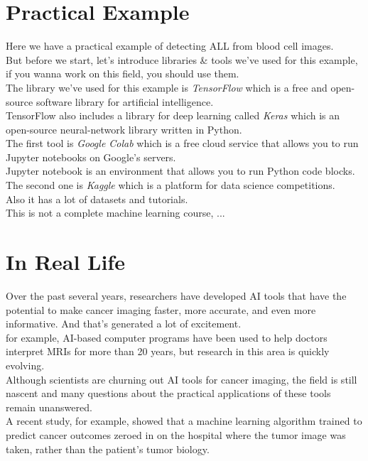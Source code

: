 \documentclass{SBCbookchapter}
\begin{document}
\section*{Practical Example}
Here we have a practical example of detecting ALL from blood cell images. \\
But before we start, let's introduce libraries \& tools we've used for this example, if you wanna
work on this field, you should use them. \\
The library we've used for this example is \textit{TensorFlow} which is a free and open-source software library for artificial intelligence. \\
TensorFlow also includes a library for deep learning called \textit{Keras} which is an open-source neural-network library written in Python. \\
The first tool is \textit{Google Colab} which is a free cloud service
that allows you to run Jupyter notebooks on Google's servers. \\
Jupyter notebook is an environment that allows you to run Python code blocks. \\
The second one is \textit{Kaggle} which is a platform for data science competitions. \\
Also it has a lot of datasets and tutorials. \\
This is not a complete machine learning course, ...

\section*{In Real Life}
Over the past several years, researchers have developed AI tools that have the potential to make cancer imaging faster, more accurate, and even more informative. And that’s generated a lot of excitement. \\
for example, AI-based computer programs have been used to help doctors interpret MRIs for more than 20 years, but research in this area is quickly evolving. \\
Although scientists are churning out AI tools for cancer imaging, the field is still nascent and many questions about the practical applications of these tools remain unanswered. \\
A recent study, for example, showed that a machine learning algorithm trained to predict cancer outcomes zeroed in on the hospital where the tumor image was taken, rather than the patient’s tumor biology.
\end{document}
